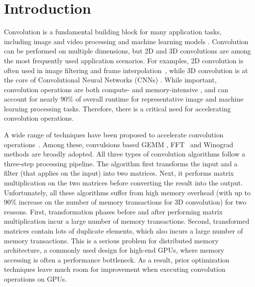 \section{Introduction}
Convolution is a fundamental building block for many application tasks, including image and video processing and machine learning
models \cite{Perrot2014Fine,Ma2014Optimized,Rudi2015Image,Niklaus2017Video,Krizhevsky2012ImageNet,SimonyanZ14a,HeZRS16,SzegedyLJSRAEVR15}. Convolution can be performed on multiple dimensions, but 2D and 3D convolutions are among the most frequently used
application scenarios. For examples, 2D convolution is often used in image filtering and frame
interpolation~\cite{Perrot2014Fine,Ma2014Optimized,Rudi2015Image,Niklaus2017Video}, while 3D convolution is at the core of Convolutional
Neural Networks (CNNs) \cite{Krizhevsky2012ImageNet,SimonyanZ14a,HeZRS16,SzegedyLJSRAEVR15}. While important, convolution operations are both compute- and memory-intensive \cite{cavigelli2015accelerating},
and can account for nearly 90\% of overall runtime \cite{Li2016Performance} for representative image and machine learning processing tasks.
Therefore, there is a critical need for accelerating convolution operations.


A wide range of techniques have been proposed to accelerate convolution
operations~\cite{Iandola2014Communication,vasilache2014fast,lavin2016fast,cho2017mec,Zhen2018Optimizing,Vasudevan2017Parallel,Chellapilla2006High}.
Among these, convulsions based GEMM
\cite{Vasudevan2017Parallel,Chellapilla2006High}, FFT~\cite{vasilache2014fast} and Winograd~\cite{lavin2016fast} methods are broadly
adopted. All three types of convolution algorithms follow a three-step processing pipeline. The algorithm first transforms the input and a
filter (that applies on the input) into two matrices. Next, it performs matrix multiplication on the two matrices before converting the
result into the output. Unfortunately, all these algorithms suffer from high memory overhead (with up to 90\% increase on the
number of memory transactions for 3D convolution) {\color{red}for two reasons. First, transformation phases before and after
performing matrix multiplication incur a large number of memory transactions. Second, transformed matrices contain lots of duplicate elements, which also incurs a large number of memory transactions.} This is a serious problem for
distributed memory architecture, a commonly used design for high-end GPUs, where memory accessing is often a performance bottleneck. As a
result, prior optimization techniques leave much room for improvement when executing convolution operations on GPUs.

